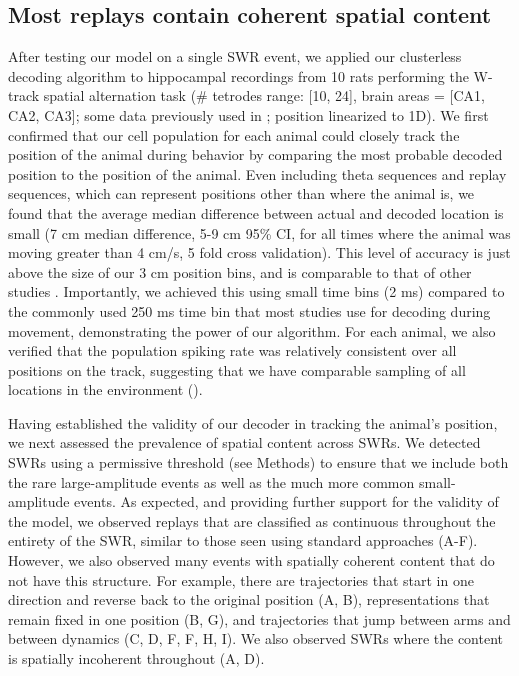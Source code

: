 \documentclass[9pt,lineno]{elife}
\begin{document}
\subsection*{Most replays contain coherent spatial content}
After testing our model on a single SWR event, we applied our clusterless decoding algorithm to hippocampal recordings from 10 rats performing the W-track spatial alternation task (\# tetrodes range: [10, 24], brain areas = [CA1, CA2, CA3]; some data previously used in \cite{KarlssonAwakereplayremote2009, KayConstantSubsecondCycling2020, CarrTransientSlowGamma2012}; position linearized to 1D). We first confirmed that our cell population for each animal could closely track the position of the animal during behavior by comparing the most probable decoded position to the position of the animal. Even including theta sequences and replay sequences, which can represent positions other than where the animal is, we found that the average median difference between actual and decoded location is small (7 cm median difference, 5-9 cm 95\% CI, for all times where the animal was moving greater than 4 cm/s, 5 fold cross validation). This level of accuracy is just above the size of our 3 cm position bins, and is comparable to that of other studies \citep{DavidsonHippocampalReplayExtended2009, ShinDynamicsAwakeHippocampalPrefrontal2019, FarooqEmergencepreconfiguredplastic2019}. Importantly, we achieved this using small time bins (2 ms) compared to the commonly used 250 ms time bin that most studies use for decoding during movement, demonstrating the power of our algorithm. For each animal, we also verified that the population spiking rate was relatively consistent over all positions on the track, suggesting that we have comparable sampling of all locations in the environment ().

Having established the validity of our decoder in tracking the animal's position, we next assessed the prevalence of spatial content across SWRs. We detected SWRs using a permissive threshold (see Methods) to ensure that we include both the rare large-amplitude events as well as the much more common small-amplitude events. As expected, and providing further support for the validity of the model, we observed replays that are classified as continuous throughout the entirety of the SWR, similar to those seen using standard approaches (A-F). However, we also observed many events with spatially coherent content that do not have this structure. For example, there are trajectories that start in one direction and reverse back to the original position (A, B), representations that remain fixed in one position (B, G), and trajectories that jump between arms and between dynamics (C, D, F, F, H, I). We also observed SWRs where the content is spatially incoherent throughout (A, D).
\end{document}

